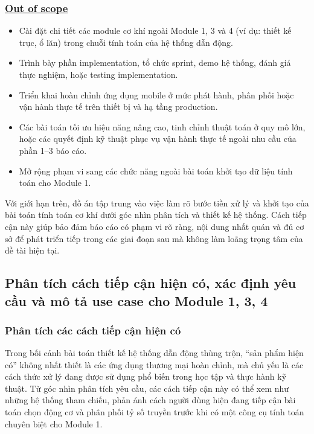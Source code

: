 \documentclass[a4paper]{article}
\begin{document}
\subsubsection*{\uline{Out of scope}}

\begin{itemize}
\item Cài đặt chi tiết các module cơ khí ngoài Module 1, 3 và 4 (ví dụ: thiết kế trục, ổ lăn) trong chuỗi tính toán của hệ thống dẫn động.
\item Trình bày phần implementation, tổ chức sprint, demo hệ thống, đánh giá thực nghiệm, hoặc testing implementation.
\item Triển khai hoàn chỉnh ứng dụng mobile ở mức phát hành, phân phối hoặc vận hành thực tế trên thiết bị và hạ tầng production.
\item Các bài toán tối ưu hiệu năng nâng cao, tinh chỉnh thuật toán ở quy mô lớn, hoặc các quyết định kỹ thuật phục vụ vận hành thực tế ngoài nhu cầu của phần 1--3 báo cáo.
\item Mở rộng phạm vi sang các chức năng ngoài bài toán khởi tạo dữ liệu tính toán cho Module 1.
\end{itemize}

Với giới hạn trên, đồ án tập trung vào việc làm rõ bước tiền xử lý và khởi tạo của bài toán tính toán cơ khí dưới góc nhìn phân tích và thiết kế hệ thống. Cách tiếp cận này giúp bảo đảm báo cáo có phạm vi rõ ràng, nội dung nhất quán và đủ cơ sở để phát triển tiếp trong các giai đoạn sau mà không làm loãng trọng tâm của đề tài hiện tại.

\newpage

\subsection{Phân tích cách tiếp cận hiện có, xác định yêu cầu và mô tả use case cho Module 1, 3, 4}
\subsubsection{Phân tích các cách tiếp cận hiện có}
Trong bối cảnh bài toán thiết kế hệ thống dẫn động thùng trộn, ``sản phẩm hiện có'' không nhất thiết là các ứng dụng thương mại hoàn chỉnh, mà chủ yếu là các cách thức xử lý đang được sử dụng phổ biến trong học tập và thực hành kỹ thuật. Từ góc nhìn phân tích yêu cầu, các cách tiếp cận này có thể xem như những hệ thống tham chiếu, phản ánh cách người dùng hiện đang tiếp cận bài toán chọn động cơ và phân phối tỷ số truyền trước khi có một công cụ tính toán chuyên biệt cho Module 1.
\end{document}
